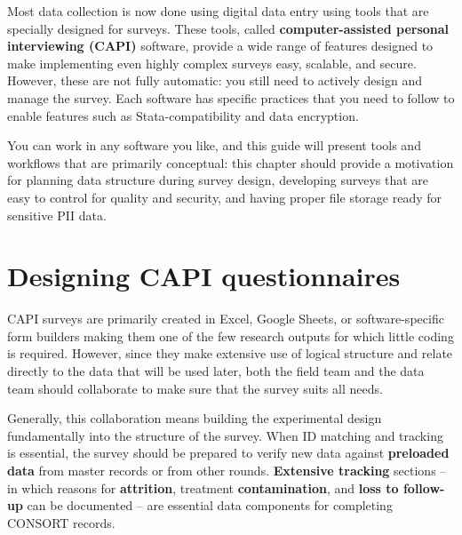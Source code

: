 
\begin{fullwidth}
Most data collection is now done using digital data entry
using tools that are specially designed for surveys.
These tools, called \textbf{computer-assisted personal interviewing (CAPI)} software,
provide a wide range of features designed to make
implementing even highly complex surveys easy, scalable, and secure.
However, these are not fully automatic:
you still need to actively design and manage the survey.
Each software has specific practices that you need to follow
to enable features such as Stata-compatibility and data encryption.

You can work in any software you like,
and this guide will present tools and workflows
that are primarily conceptual:
this chapter should provide a motivation for
planning data structure during survey design,
developing surveys that are easy to control for quality and security,
and having proper file storage ready for sensitive PII data.
\end{fullwidth}


\section{Designing CAPI questionnaires}

CAPI surveys
are primarily created in Excel, Google Sheets,
or software-specific form builders
making them one of the few research outputs for which little coding is required.
However, since they make extensive use of logical structure and
relate directly to the data that will be used later,
both the field team and the data team should
collaborate to make sure that the survey suits all needs.\cite{krosnick2018questionnaire}

Generally, this collaboration means building the experimental design
fundamentally into the structure of the survey.
When ID matching and tracking is essential,
the survey should be prepared to verify new data
against \textbf{preloaded data} from master records or from other rounds.
\textbf{Extensive tracking} sections --
in which reasons for \textbf{attrition}, treatment \textbf{contamination}, and
\textbf{loss to follow-up} can be documented --
are essential data components for completing CONSORT records.\cite{begg1996improving}

